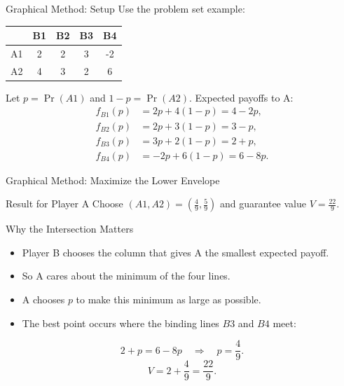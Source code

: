 \documentclass[10pt,aspectratio=169]{beamer}
\begin{document}
\begin{frame}{Graphical Method: Setup}
Use the problem set example:
\begin{center}
\begin{tabular}{c c c c c}
 & B1 & B2 & B3 & B4\\
\midrule
A1 & 2 & 2 & 3 & -2\\
A2 & 4 & 3 & 2 & 6\\
\end{tabular}
\end{center}
\vspace{0.2cm}
Let $p=\Pr(A1)$ and $1-p=\Pr(A2)$. Expected payoffs to A:
\begin{align*}
f_{B1}(p)&=2p+4(1-p)=4-2p,\\
f_{B2}(p)&=2p+3(1-p)=3-p,\\
f_{B3}(p)&=3p+2(1-p)=2+p,\\
f_{B4}(p)&=-2p+6(1-p)=6-8p.
\end{align*}
\end{frame}

\begin{frame}{Graphical Method: Maximize the Lower Envelope}
\begin{center}
\end{center}
\vspace{-0.2cm}
\begin{block}{Result for Player A}
Choose $(A1,A2)=\left(\frac{4}{9},\frac{5}{9}\right)$ and guarantee value $V=\frac{22}{9}$.
\end{block}
\end{frame}

\begin{frame}{Why the Intersection Matters}
\begin{itemize}
  \item Player B chooses the column that gives A the smallest expected payoff.
  \item So A cares about the minimum of the four lines.
  \item A chooses $p$ to make this minimum as large as possible.
  \item The best point occurs where the binding lines $B3$ and $B4$ meet:
\end{itemize}
\[
2+p=6-8p \quad \Rightarrow \quad p=\frac{4}{9}.
\]
\[
V=2+\frac{4}{9}=\frac{22}{9}.
\]
\end{frame}
\end{document}
